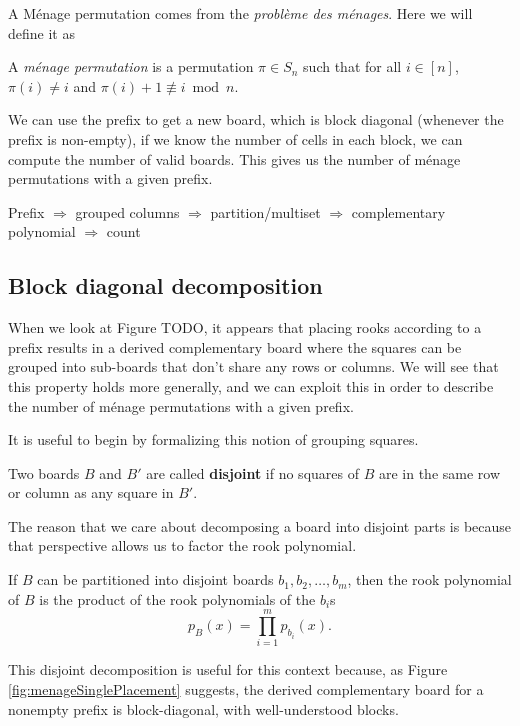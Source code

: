A M\'enage permutation comes from the \textit{problème des ménages}. %
Here we will define it as
\begin{definition}
  A \textit{m\'enage permutation} is a permutation $\pi \in S_n$ such that for
  all $i \in [n]$,
  $\pi(i) \neq i$ and
  $\pi(i) + 1 \not\equiv i \bmod n$.
\end{definition}

We can use the prefix to get a new board, which is block diagonal
(whenever the prefix is non-empty), if we know the number of cells in each
block, we can compute the number of valid boards. This gives us the number of
m\'enage permutations with a given prefix.

Prefix $\Rightarrow$ grouped columns $\Rightarrow$ partition/multiset $\Rightarrow$ complementary polynomial $\Rightarrow$ count

\subsection{Block diagonal decomposition}
When we look at Figure TODO, it appears that placing rooks according to a prefix
results in a derived complementary board where the squares can be grouped into
sub-boards that don't share any rows or columns. We will see that this property
holds more generally, and we can exploit this in order to describe the number
of m\'enage permutations with a given prefix.

It is useful to begin by formalizing this notion of grouping squares.
\begin{definition}
  Two boards $B$ and $B'$ are called \textbf{disjoint} if no squares of $B$ are
  in the same row or column as any square in $B'$.
\end{definition}

The reason that we care about decomposing a board into disjoint parts
is because that perspective allows us to factor the rook polynomial.
\begin{theorem}
  If $B$ can be partitioned into disjoint boards $b_1, b_2, \dots, b_m$,
  then the rook polynomial of $B$ is the product of the rook polynomials of
  the $b_i$s \[
    p_B(x) = \prod_{i=1}^m p_{b_i}(x).
  \]
\end{theorem}

This disjoint decomposition is useful for this context because,
as Figure \ref{fig:menageSinglePlacement} suggests, the derived
complementary board for a nonempty prefix is block-diagonal,
with well-understood blocks.

